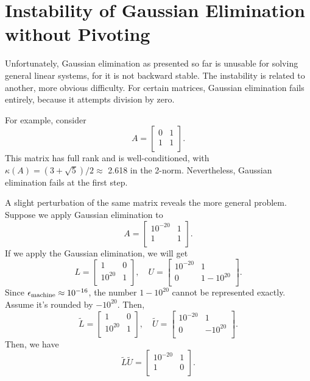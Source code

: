 \section{Instability of Gaussian Elimination without Pivoting}
Unfortunately, Gaussian elimination as presented so far is unusable for solving general linear systems, for it is not backward stable. The instability is related to another, more obvious difficulty. For certain matrices, Gaussian elimination fails entirely, because it attempts division by zero.

For example, consider
\[
    A = \begin{bmatrix}
        0 &  1 \\
        1 &  1 \\
    \end{bmatrix}.  
\]
This matrix has full rank and is well-conditioned, with $\kappa(A)=(3+\sqrt{5}) / 2 \approx$ 2.618 in the 2-norm. Nevertheless, Gaussian elimination fails at the first step.

A slight perturbation of the same matrix reveals the more general problem. Suppose we apply Gaussian elimination to
\begin{equation}
\label{eq: bad eg for GE}
    A = \begin{bmatrix}
        10^{-20} &1   \\
         1 &1   \\
    \end{bmatrix} . 
\end{equation}
If we apply the Gaussian elimination, we will get 
\[
    L= \begin{bmatrix}
        1 &  0 \\
        10^{20} &  1 \\
    \end{bmatrix}, \quad U = \begin{bmatrix}
        10^{-20} &  1 \\
        0 &  1-10^{20} \\
    \end{bmatrix}.   
\]
Since $\epsilon_{\text{machine}}\approx 10^{-16}$, the number $1-10^{20}$ cannot be represented exactly. Assume it's rounded by $-10^{20}$. Then, 
\[
    \tilde L = \begin{bmatrix}
        1 &  0 \\
        10^{20} &  1 \\
    \end{bmatrix}, \quad \tilde U = \begin{bmatrix}
        10^{-20} &  1 \\
        0 &  -10^{20} \\
    \end{bmatrix}.  
\]
Then, we have 
\[
    \tilde L \tilde U = \begin{bmatrix}
        10^{-20} &1   \\
         1& 0   \\
    \end{bmatrix}.   
\]

